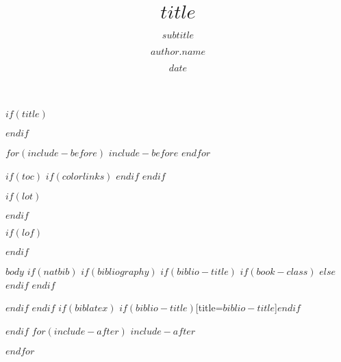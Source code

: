 \documentclass[%
$if(fontsize)$
  $fontsize$,
$endif$
$if(lang)$
  $babel-lang$,
$endif$
numbers=noendperiod,
bibliography=totoc,
$if(papersize)$
  $papersize$paper,
$endif$
$if(fontsize)$
  $fontsize$,
$endif$
$for(classoption)$$classoption$$sep$,$endfor$,
]{scrbook}
\title{$title$}
\subtitle{$subtitle$}
\author[$author.id$]{$author.name$}
\affil[$affil.id$]{$affil.name$}
\date{$date$}
\begin{document}
$if(title)$
\maketitle
$endif$

\frontmatter


$for(include-before)$
$include-before$
$endfor$

$if(toc)$
$if(colorlinks)$
\hypersetup{linkcolor=$if(toccolor)$$toccolor$$else$black$endif$}
$endif$
\setcounter{tocdepth}{$toc-depth$}
\tableofcontents
$endif$

$if(lot)$
\listoftables
$endif$

$if(lof)$
\listoffigures
$endif$


\mainmatter


$body$
$if(natbib)$
$if(bibliography)$
$if(biblio-title)$
$if(book-class)$
\renewcommand\bibname{$biblio-title$}
$else$
\renewcommand\refname{$biblio-title$}
$endif$
$endif$
  

$endif$
$endif$
$if(biblatex)$
\printbibliography$if(biblio-title)$[title=$biblio-title$]$endif$

$endif$
$for(include-after)$
$include-after$

$endfor$
\end{document}
